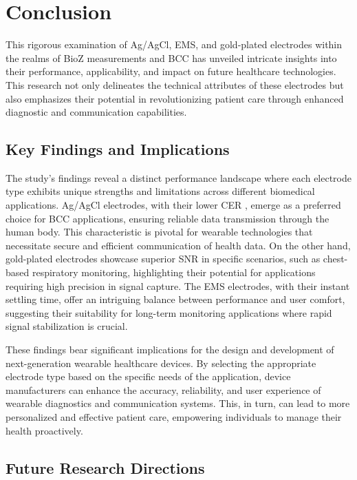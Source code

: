 \documentclass[conference]{IEEEtran}
\begin{document}
\section{Conclusion}

This rigorous examination of Ag/AgCl, \gls{EMS}, and gold-plated electrodes within the realms of \gls{BioZ} measurements and \gls{BCC} has unveiled intricate insights into their performance, applicability, and impact on future healthcare technologies. This research not only delineates the technical attributes of these electrodes but also emphasizes their potential in revolutionizing patient care through enhanced diagnostic and communication capabilities.

\subsection{Key Findings and Implications}

The study's findings reveal a distinct performance landscape where each electrode type exhibits unique strengths and limitations across different biomedical applications. Ag/AgCl electrodes, with their lower \gls{CER} , emerge as a preferred choice for \gls{BCC} applications, ensuring reliable data transmission through the human body. This characteristic is pivotal for wearable technologies that necessitate secure and efficient communication of health data. On the other hand, gold-plated electrodes showcase superior \gls{SNR} in specific scenarios, such as chest-based respiratory monitoring, highlighting their potential for applications requiring high precision in signal capture. The \gls{EMS} electrodes, with their instant settling time, offer an intriguing balance between performance and user comfort, suggesting their suitability for long-term monitoring applications where rapid signal stabilization is crucial.

These findings bear significant implications for the design and development of next-generation wearable healthcare devices. By selecting the appropriate electrode type based on the specific needs of the application, device manufacturers can enhance the accuracy, reliability, and user experience of wearable diagnostics and communication systems. This, in turn, can lead to more personalized and effective patient care, empowering individuals to manage their health proactively.

\subsection{Future Research Directions}
\end{document}

